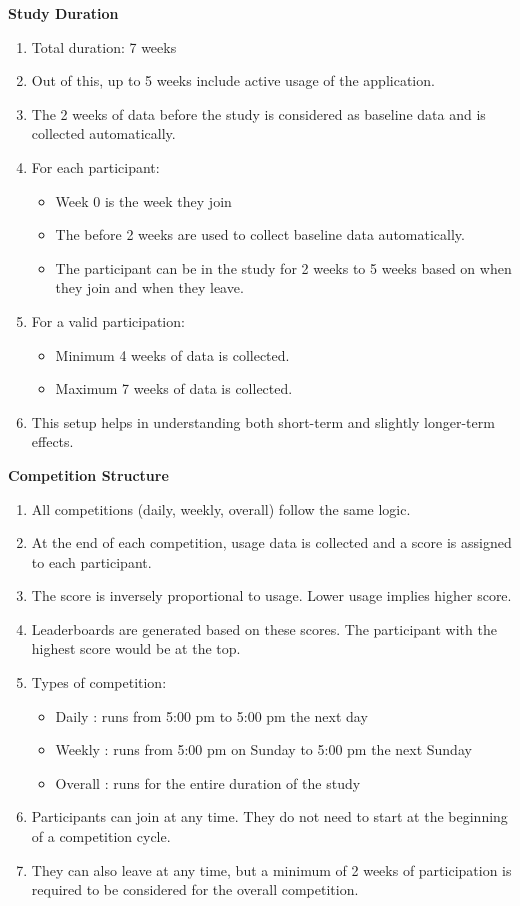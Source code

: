 \documentclass{article}
\begin{document}
\textbf{Study Duration}
\begin{enumerate}
    \item Total duration: 7 weeks
    \item Out of this, up to 5 weeks include active usage of the application.
    \item The 2 weeks of data before the study is considered as baseline data and is collected automatically.
    \item For each participant:
    \begin{itemize}
        \item Week 0 is the week they join
        \item The before 2 weeks are used to collect baseline data automatically.
        \item The participant can be in the study for 2 weeks to 5 weeks based on when they join and when they leave.
    \end{itemize}
    \item For a valid participation:
    \begin{itemize}
        \item Minimum 4 weeks of data is collected.
        \item Maximum 7 weeks of data is collected.
    \end{itemize}
    \item This setup helps in understanding both short-term and slightly longer-term effects.
\end{enumerate}

\textbf{Competition Structure}
\begin{enumerate}
    \item All competitions (daily, weekly, overall) follow the same logic.
    \item At the end of each competition, usage data is collected and a score is assigned to each participant.
    \item The score is inversely proportional to usage. Lower usage implies higher score.
    \item Leaderboards are generated based on these scores. The participant with the highest score would be at the top.
    \item Types of competition:
    \begin{itemize}
        \item Daily : runs from 5:00 pm to 5:00 pm the next day
        \item Weekly : runs from 5:00 pm on Sunday to 5:00 pm the next Sunday
        \item Overall : runs for the entire duration of the study
    \end{itemize}
    \item Participants can join at any time. They do not need to start at the beginning of a competition cycle.
    \item They can also leave at any time, but a minimum of 2 weeks of participation is required to be considered for the overall competition.
\end{enumerate}
\end{document}

